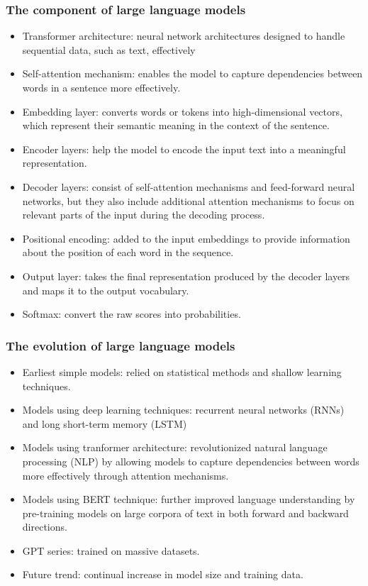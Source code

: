 \documentclass[runningheads]{llncs}
\begin{document}
    \subsubsection{The component of large language models}
      \begin{itemize}
        \item Transformer architecture: neural network architectures designed to handle sequential data, such as text, effectively \cite{Vaswani17}
        \item Self-attention mechanism: enables the model to capture dependencies between words in a sentence more effectively.
        \item Embedding layer:  converts words or tokens into high-dimensional vectors, which represent their semantic meaning in the context of the sentence.
        \item Encoder layers: help the model to encode the input text into a meaningful representation.
        \item Decoder layers: consist of self-attention mechanisms and feed-forward neural networks, but they also include additional attention mechanisms to focus on relevant parts of the input during the decoding process.
        \item Positional encoding: added to the input embeddings to provide information about the position of each word in the sequence.
        \item Output layer: takes the final representation produced by the decoder layers and maps it to the output vocabulary.
        \item Softmax: convert the raw scores into probabilities.
      \end{itemize}
    \subsubsection{The evolution of large language models}
      \begin{itemize}
        \item Earliest simple models: relied on statistical methods and shallow learning techniques.
        \item Models using deep learning techniques: recurrent neural networks (RNNs) and long short-term memory (LSTM) 
        \item Models using tranformer architecture: revolutionized natural language processing (NLP) by allowing models to capture dependencies between words more effectively through attention mechanisms.
        \item Models using BERT technique: further improved language understanding by pre-training models on large corpora of text in both forward and backward directions. 
        \item GPT series: trained on massive datasets.
        \item Future trend: continual increase in model size and training data.
      \end{itemize}
\end{document}
